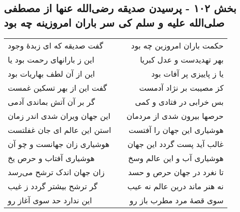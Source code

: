 \begin{center}
\section*{بخش ۱۰۲ - پرسیدن صدیقه رضی‌الله عنها از مصطفی صلی‌الله علیه و سلم کی سر باران امروزینه چه بود}
\label{sec:sh102}
\begin{longtable}{l p{0.5cm} r}
گفت صدیقه که ای زبدهٔ وجود
&&
حکمت باران امروزین چه بود
\\
این ز بارانهای رحمت بود یا
&&
بهر تهدیدست و عدل کبریا
\\
این از آن لطف بهاریات بود
&&
یا ز پاییزی پر آفات بود
\\
گفت این از بهر تسکین غمست
&&
کز مصیبت بر نژاد آدمست
\\
گر بر آن آتش بماندی آدمی
&&
بس خرابی در فتادی و کمی
\\
این جهان ویران شدی اندر زمان
&&
حرصها بیرون شدی از مردمان
\\
استن این عالم ای جان غفلتست
&&
هوشیاری این جهان را آفتست
\\
هوشیاری زان جهانست و چو آن
&&
غالب آید پست گردد این جهان
\\
هوشیاری آفتاب و حرص یخ
&&
هوشیاری آب و این عالم وسخ
\\
زان جهان اندک ترشح می‌رسد
&&
تا نغرد در جهان حرص و حسد
\\
گر ترشح بیشتر گردد ز غیب
&&
نه هنر ماند درین عالم نه عیب
\\
این ندارد حد سوی آغاز رو
&&
سوی قصهٔ مرد مطرب باز رو
\\
\end{longtable}
\end{center}
